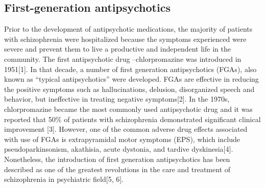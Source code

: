 \documentclass[12pt]{report}
\begin{document}
		\subsection{First-generation antipsychotics}
			Prior to the development of antipsychotic medications, the majority of patients with schizophrenia were hospitalized because the symptoms experienced were severe and prevent them to live a productive and independent life in the community.
			The first antipsychotic drug –chlorpromazine was introduced in 1951[1].
			In that decade, a number of first generation antipsychotics (FGAs), also known as “typical antipsychotics” were developed.
			FGAs are effective in reducing the positive symptoms such as hallucinations, delusion, disorganized speech and behavior, but ineffective in treating negative symptoms[2].
			In the 1970s, chlorpromazine became the most commonly used antipsychotic drug and it was reported that 50$\%$ of patients with schizophrenia demonstrated significant clinical improvement [3].
			However, one of the common adverse drug effects associated with use of FGAs is extrapyramidal motor symptoms (EPS), which include pseudoparkinsonism, akathisia, acute dystonia, and tardive dyskinesia[4].
			Nonetheless, the introduction of first generation antipsychotics has been described as one of the greatest revolutions in the care and treatment of schizophrenia in psychiatric field[5, 6]. 
\end{document}
